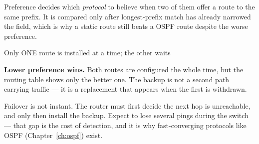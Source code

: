 \begin{keyidea}
Preference decides which \emph{protocol} to believe when two of them
offer a route to the same prefix. It is compared only after longest-prefix
match has already narrowed the field, which is why a  static
route still beats a  OSPF route despite the worse preference.
\end{keyidea}

\begin{netfigure}{Only ONE route is installed at a time; the other waits}

\smallskip
{\scriptsize \textbf{Lower preference wins.} Both routes are configured the whole
time, but the routing table shows only the better one. The backup is not a
second path carrying traffic --- it is a replacement that appears when the
first is withdrawn.}
\end{netfigure}

\begin{pitfall}
Failover is not instant. The router must first decide the next hop is unreachable, and only then install the backup. Expect to lose several pings during the switch --- that gap is the cost of detection, and it is why fast-converging protocols like OSPF (Chapter~\ref{ch:ospf}) exist.
\end{pitfall}

